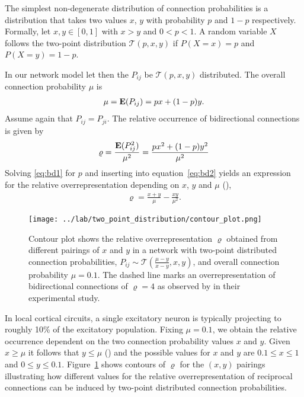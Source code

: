 
The simplest non-degenerate distribution of connection probabilities is a distribution that takes two values $x$, $y$ with probability $p$ and $1-p$ respectively. Formally, let $x,y \in [0,1]$ with $x > y$ and $0 < p < 1$. A random variable $X$ follows the two-point distribution %
$\mathcal{T}(p,x,y)$ if $P(X=x)=p$ and $P(X=y) = 1-p$. 

In our network model let then the $P_{ij}$ be $\mathcal{T}(p,x,y)$ distributed. The overall connection probability $\mu$ is
\begin{align}
\mu = \operatorname{\mathbf{E}}(P_{ij}) = px + (1-p)y. \label{eq:bd1}
\end{align}
Assume again that $P_{ij} = P_{ji}$. The relative occurrence of bidirectional connections is given by
\begin{align}
  \varrho = \frac{\operatorname{\mathbf{E}}(P_{ij}^2)}{\mu^2} = \frac{p x^2 + (1-p) y^2}{\mu^2} \label{eq:bd2}
\end{align}
Solving \eqref{eq:bd1} for $p$ and inserting into equation~\eqref{eq:bd2} yields an expression for the relative overrepresentation depending on $x$, $y$ and $\mu$ (),
\begin{align}
\varrho = \frac{x+y}{\mu} - \frac{xy}{\mu^2}.
\end{align}

\begin{figure}[h!]
\centering
\texttt{[image: ../lab/two\_point\_distribution/contour\_plot.png]}
\caption{Contour plot shows the relative overrepresentation $\varrho$ obtained from different pairings of $x$ and $y$ in a network with two-point distributed connection probabilities, $P_{ij} \sim \mathcal{T}(\frac{\mu-y}{x-y},x,y)$, and overall connection probability $\mu = 0.1$. The dashed line marks an overrepresentation of bidirectional connections of $\varrho=4$ as observed by \textcite{Song2005} in their experimental study.}
\label{fig:tp}
\end{figure}

In local cortical circuits, a single excitatory neuron is typically projecting to roughly 10\% of the excitatory population. Fixing $\mu = 0.1$, we obtain the relative occurrence dependent on the two connection probability values $x$ and $y$. Given $x \geq \mu$ it follows that $y \leq \mu$ () and the possible values for $x$ and $y$ are $0.1 \leq x \leq 1$ and $0 \leq y \leq 0.1$. Figure~\ref{fig:tp} shows contours of $\varrho$ for the $(x,y)$ pairings illustrating how different values for the relative overrepresentation of reciprocal connections can be induced by two-point distributed connection probabilities.  





